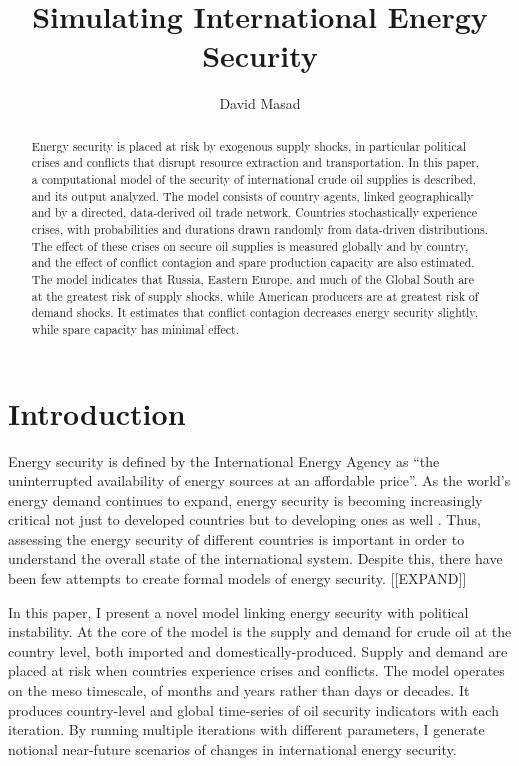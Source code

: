 \documentclass{llncs}
\begin{document}
\title{Simulating International Energy Security}
	\author{David Masad}
	\date{}
	\maketitle


\begin{abstract}
Energy security is placed at risk by exogenous supply shocks, in particular political crises and conflicts that disrupt resource extraction and transportation. In this paper, a computational model of the security of international crude oil supplies is described, and its output analyzed. The model consists of country agents, linked geographically and by a directed, data-derived oil trade network. Countries stochastically experience crises, with probabilities and durations drawn randomly from data-driven distributions. The effect of these crises on secure oil supplies is measured globally and by country, and the effect of conflict contagion and spare production capacity are also estimated. The model indicates that Russia, Eastern Europe, and much of the Global South are at the greatest risk of supply shocks, while American producers are at greatest risk of demand shocks. It estimates that conflict contagion decreases energy security slightly, while spare capacity has minimal effect. 
\end{abstract}

\section{Introduction}

Energy security is defined by the International Energy Agency as ``the uninterrupted availability of energy sources at an affordable price''\cite{iea_2013}. As the world's energy demand continues to expand, energy security is becoming increasingly critical not just to developed countries but to developing ones as well \cite{yergin_2006}. Thus, assessing the energy security of different countries is important in order to understand the overall state of the international system. Despite this, there have been few attempts to create formal models of energy security. [[EXPAND]]

In this paper, I present a novel model linking energy security with political instability. At the core of the model is the supply and demand for crude oil at the country level, both imported and domestically-produced. Supply and demand are placed at risk when countries experience crises and conflicts. The model operates on the meso timescale, of months and years rather than days or decades.  It produces country-level and global time-series of oil security indicators with each iteration. By running multiple iterations with different parameters, I generate notional near-future scenarios of changes in international energy security. 
\end{document}
